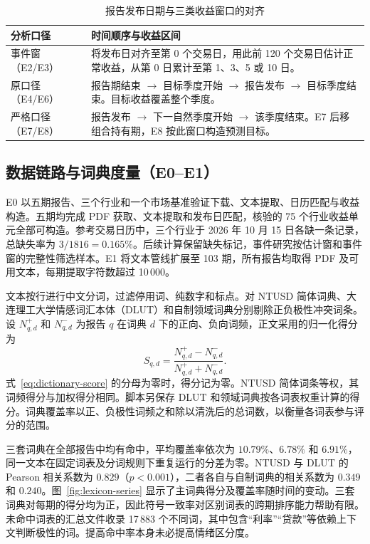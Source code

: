 \begin{table}[htbp]
  \centering\small
  \caption{报告发布日期与三类收益窗口的对齐}
  \label{tab:alignment}
  \begin{tabularx}{\linewidth}{@{}p{.25\linewidth} X@{}}
    \toprule
    分析口径 & 时间顺序与收益区间 \\
    \midrule
    事件窗（E2/E3） & 将发布日对齐至第 0 个交易日，用此前 120 个交易日估计正常收益，从第 0 日累计至第 1、3、5 或 10 日。 \\
    原口径（E4/E6） & 报告期结束 $\longrightarrow$ 目标季度开始 $\longrightarrow$ 报告发布 $\longrightarrow$ 目标季度结束。目标收益覆盖整个季度。 \\
    严格口径（E7/E8） & 报告发布 $\longrightarrow$ 下一自然季度开始 $\longrightarrow$ 该季度结束。E7 后移组合持有期，E8 按此窗口构造预测目标。 \\
    \bottomrule
  \end{tabularx}
\end{table}

\subsection{数据链路与词典度量（E0--E1）}

E0 以五期报告、三个行业和一个市场基准验证下载、文本提取、日历匹配与收益构造。五期均完成 PDF 获取、文本提取和发布日匹配，核验的 75 个行业收益单元全部可构造。参考交易日历中，三个行业于 2026 年 10 月 15 日各缺一条记录，总缺失率为 $3/1816=0.165\%$。后续计算保留缺失标记，事件研究按估计窗和事件窗的完整性筛选样本。E1 将文本管线扩展至 103 期，所有报告均取得 PDF 及可用文本，每期提取字符数超过 10\,000。

文本按行进行中文分词，过滤停用词、纯数字和标点。对 NTUSD 简体词典、大连理工大学情感词汇本体（DLUT）和自制领域词典分别剔除正负极性冲突词条。设 $N_{q,d}^{+}$ 和 $N_{q,d}^{-}$ 为报告 $q$ 在词典 $d$ 下的正向、负向词频，正文采用的归一化得分为
\begin{equation}
  S_{q,d}=\frac{N_{q,d}^{+}-N_{q,d}^{-}}{N_{q,d}^{+}+N_{q,d}^{-}}.
  \label{eq:dictionary-score}
\end{equation}
式~\eqref{eq:dictionary-score} 的分母为零时，得分记为零。NTUSD 简体词条等权，其词频得分与加权得分相同。脚本另保存 DLUT 和领域词典按各词表权重计算的得分。词典覆盖率以正、负极性词频之和除以清洗后的总词数，以衡量各词表参与评分的范围。

三套词典在全部报告中均有命中，平均覆盖率依次为 $10.79\%$、$6.78\%$ 和 $6.91\%$，同一文本在固定词表及分词规则下重复运行的分差为零。NTUSD 与 DLUT 的 Pearson 相关系数为 $0.829$（$p<0.001$），二者各自与自制词典的相关系数为 $0.349$ 和 $0.240$。图~\ref{fig:lexicon-series} 显示了主词典得分及覆盖率随时间的变动。三套词典对每期的得分均为正，因此符号一致率对区别词表的跨期排序能力帮助有限。未命中词表的汇总文件收录 17\,883 个不同词，其中包含“利率”“贷款”等依赖上下文判断极性的词。提高命中率本身未必提高情绪区分度。

